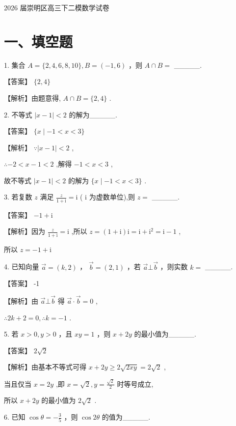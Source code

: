 \documentclass[10pt]{article}
\begin{document}
2026 届崇明区高三下二模数学试卷

\section*{一、填空题}

1. 集合 \(A = \{ 2,4,6,8,{10}\} ,B = \left( {-1,6}\right)\) ，则 \(A \cap  B =\) \_\_\_\_\_.

【答案】 \(\{ 2,4\}\)

【解析】由题意得, \(A \cap  B = \{ 2,4\}\) .

2. 不等式 \(\left| {x - 1}\right|  < 2\) 的解为\_\_\_\_\_.

【答案】 \(\{ x \mid   - 1 < x < 3\}\)

【解析】 \(\because \left| {x - 1}\right|  < 2\) ,

\(\therefore  - 2 < x - 1 < 2\) ,解得 \(- 1 < x < 3\) ,

故不等式 \(\left| {x - 1}\right|  < 2\) 的解为 \(\{ x \mid   - 1 < x < 3\}\) .

3. 若复数 \(z\) 满足 \(\frac{z}{1 + \mathrm{i}} = \mathrm{i}\) ( \(\mathrm{i}\) 为虚数单位),则 \(z =\) \_\_\_\_\_.

【答案】 \(- 1 + \mathrm{i}\)

【解析】因为 \(\frac{z}{1 + \mathrm{i}} = \mathrm{i}\) ,所以 \(z = \left( {1 + \mathrm{i}}\right) \mathrm{i} = \mathrm{i} + {\mathrm{i}}^{2} = \mathrm{i} - 1\) ,

所以 \(z =  - 1 + \mathrm{i}\)

4. 已知向量 \(\overrightarrow{a} = \left( {k,2}\right)\) ， \(\overrightarrow{b} = \left( {2,1}\right)\) ，若 \(\overrightarrow{a}\bot \overrightarrow{b}\) ，则实数 \(k =\) \_\_\_\_\_.

【答案】 -1

【解析】由 \(\overrightarrow{a} \bot  \overrightarrow{b}\) 得 \(\overrightarrow{a} \cdot  \overrightarrow{b} = 0\) ,

\(\therefore {2k} + 2 = 0,\therefore k =  - 1\) .

5. 若 \(x > 0,y > 0\) ，且 \({xy} = 1\) ，则 \(x + {2y}\) 的最小值为\_\_\_\_\_.

【答案】 \(2\sqrt{2}\)

【解析】由基本不等式可得 \(x + {2y} \geq  2\sqrt{2xy} = 2\sqrt{2}\) ,

当且仅当 \(x = {2y}\) ,即 \(x = \sqrt{2},y = \frac{\sqrt{2}}{2}\) 时等号成立,

所以 \(x + {2y}\) 的最小值为 \(2\sqrt{2}\) .

6. 已知 \(\cos \theta  =  - \frac{3}{5}\) ，则 \(\cos {2\theta }\) 的值为\_\_\_\_\_.
\end{document}
